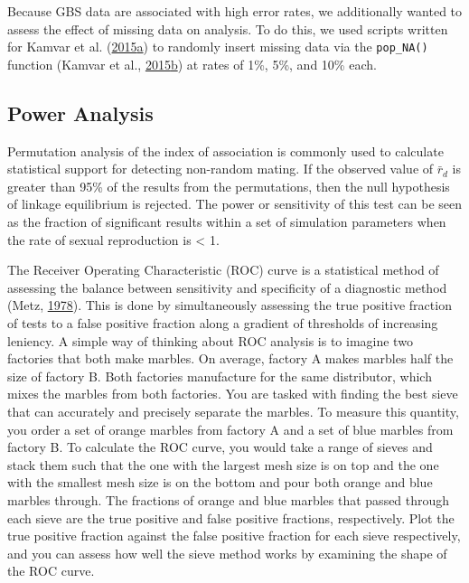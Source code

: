 \documentclass[double,11pt]{beavtex}
\begin{document}
  Because GBS data are associated with high error rates, we additionally
  wanted to assess the effect of missing data on analysis. To do this, we
  used scripts written for Kamvar et al.
  (\protect\hyperlink{ref-kamvar2015novel}{2015}\protect\hyperlink{ref-kamvar2015novel}{a})
  to randomly insert missing data via the \texttt{pop\_NA()} function
  (Kamvar et al.,
  \protect\hyperlink{ref-kamvar2015poppr2supp}{2015}\protect\hyperlink{ref-kamvar2015poppr2supp}{b})
  at rates of 1\%, 5\%, and 10\% each.
  
  \subsection{Power Analysis}\label{power-analysis}
  
  Permutation analysis of the index of association is commonly used to
  calculate statistical support for detecting non-random mating. If the
  observed value of \(\bar{r}_d\) is greater than 95\% of the results from
  the permutations, then the null hypothesis of linkage equilibrium is
  rejected. The power or sensitivity of this test can be seen as the
  fraction of significant results within a set of simulation parameters
  when the rate of sexual reproduction is \textless{} 1.
  
  The Receiver Operating Characteristic (ROC) curve is a statistical
  method of assessing the balance between sensitivity and specificity of a
  diagnostic method (Metz, \protect\hyperlink{ref-metz1978basic}{1978}).
  This is done by simultaneously assessing the true positive fraction of
  tests to a false positive fraction along a gradient of thresholds of
  increasing leniency. A simple way of thinking about ROC analysis is to
  imagine two factories that both make marbles. On average, factory A
  makes marbles half the size of factory B. Both factories manufacture for
  the same distributor, which mixes the marbles from both factories. You
  are tasked with finding the best sieve that can accurately and precisely
  separate the marbles. To measure this quantity, you order a set of
  orange marbles from factory A and a set of blue marbles from factory B.
  To calculate the ROC curve, you would take a range of sieves and stack
  them such that the one with the largest mesh size is on top and the one
  with the smallest mesh size is on the bottom and pour both orange and
  blue marbles through. The fractions of orange and blue marbles that
  passed through each sieve are the true positive and false positive
  fractions, respectively. Plot the true positive fraction against the
  false positive fraction for each sieve respectively, and you can assess
  how well the sieve method works by examining the shape of the ROC curve.
  
\end{document}
